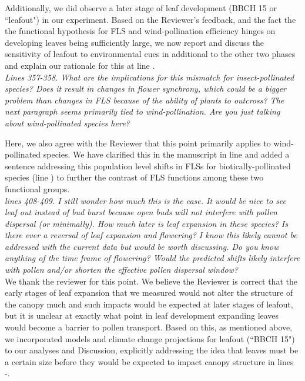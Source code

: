 \documentclass[11pt]{article}
\begin{document}
\noindent Additionally, we did observe a later stage of leaf development (BBCH 15 or ``leafout") in our experiment. Based on the Reviewer's feedback, and the fact the the functional hypothesis for FLS and wind-pollination efficiency hinges on developing leaves being sufficiently large, we now report and discuss the sensitivity of leafout to environmental cues in additional to the other two phases and explain our rationale for this at line .\\ 

\emph{Lines  357-358. What are the implications for this mismatch for insect-pollinated species? Does it result in changes in flower synchrony, which could be a bigger problem than changes in FLS because of the ability of plants to outcross? The next paragraph seems primarily tied to wind-pollination. Are you just talking about wind-pollinated species here?}
 
Here, we also agree with the Reviewer that this point primarily applies to wind-pollinated species. We have clarified this in the manuscript in line  and added a sentence addressing this population level shifts in FLSs for biotically-pollinated species (line ) to further the contrast of FLS functions among these two functional groups. \\
 
\emph{lines 408-409. I still wonder how much this is the case. It would be nice to see leaf out instead of bud burst because open buds will not interfere with pollen dispersal (or minimally). How much later is leaf expansion in these species? Is there ever a reversal of leaf expansion and flowering? I know this likely cannot be addressed with the current data but would be worth discussing. Do you know anything of the time frame of flowering? Would the predicted shifts likely interfere with pollen and/or shorten the effective pollen dispersal window?}\\

We thank the reviewer for this point. We believe the Reviewer is correct that the early stages of leaf expansion that we measured would not alter the structure of the canopy much and such impacts would be expected at later stages of leafout, but it is unclear at exactly what point in leaf development expanding leaves would become a barrier to pollen transport.
Based on this, as mentioned above, we incorporated models and climate change projections for leafout (``BBCH 15") to our analyses and Discussion, explicitly addressing the idea that leaves must be a certain size before they would be expected to impact canopy structure in lines -.\\
\end{document}
